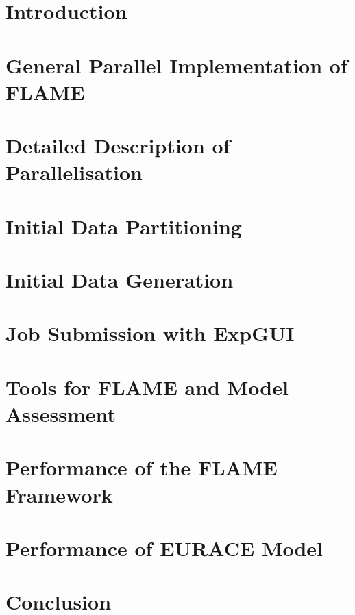 \documentclass[a4paper,11pt]{article}
\begin{document}
\section{Introduction}	
\section{General Parallel Implementation of FLAME} 
\section{Detailed Description of Parallelisation} 
\section{Initial Data Partitioning} 
\section{Initial Data Generation} 
\section{Job Submission with ExpGUI} 
\section{Tools for FLAME and Model Assessment} 
\section{Performance of the FLAME Framework} 
\section{Performance of EURACE Model} 
\section{Conclusion} 

\newpage
\appendix 

\end{document}
